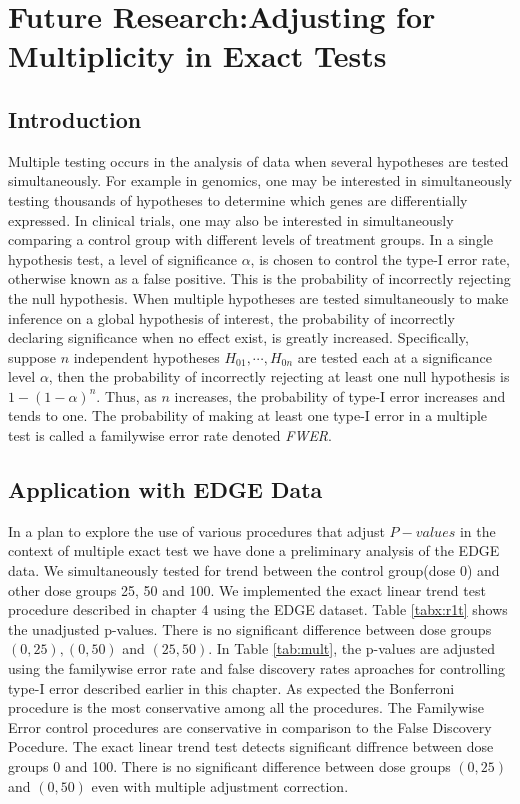 \documentclass[12pt,oneside]{report}
\theoremstyle{definition}
\theoremstyle{mystyle}
\begin{document}
\chapter{Future Research:Adjusting for  Multiplicity in Exact  Tests}
\section{Introduction}
Multiple testing occurs in the analysis of data when several hypotheses are tested simultaneously. For example in  genomics, one may be interested in  simultaneously  testing   thousands of  hypotheses  to determine  which genes are  differentially expressed. In clinical trials, one may also  be interested in simultaneously  comparing a control group with different levels of treatment groups. In a single hypothesis test, a  level of significance  $\alpha$, is chosen to control the type-I error rate, otherwise known as a false positive. This  is the probability of incorrectly rejecting the null hypothesis. When multiple hypotheses are  tested simultaneously to make inference on a global hypothesis  of interest, the probability of incorrectly declaring significance when no effect exist, is greatly increased. Specifically, suppose $n$ independent  hypotheses $H_{01},\cdots,H_{0n}$  are tested each at a significance level $\alpha$,  then the probability  of incorrectly rejecting at least one null hypothesis is $1-(1-\alpha)^{n}$. Thus, as $n$ increases, the probability of type-I error increases and tends to one. The probability of making at least one type-I error in a multiple test is called   a familywise error rate  denoted \textit{FWER}.




\section{Application with EDGE Data}
In a plan to explore the use of various procedures that adjust $P-values$ in the context of multiple exact test we have done a preliminary analysis of the EDGE data. We simultaneously tested for  trend  between the control group(dose 0) and other dose groups 25, 50 and 100. We  implemented the exact linear trend test procedure described in chapter 4 using the EDGE dataset. Table \ref{tabx:r1t} shows the unadjusted p-values. There is no significant difference between dose groups $(0,25),(0,50)$ and $(25,50)$.  In Table \ref{tab:mult}, the p-values are  adjusted using the  familywise error rate and false discovery rates aproaches for controlling type-I error  described earlier in this chapter. As expected the Bonferroni procedure is the most  conservative among all the procedures. The Familywise Error control procedures are  conservative in comparison to the False Discovery Pocedure. The exact linear trend test detects significant diffrence between dose groups 0 and 100. There is no significant difference between dose groups $(0,25)$ and $(0,50)$ even with multiple adjustment correction. 
\end{document}
